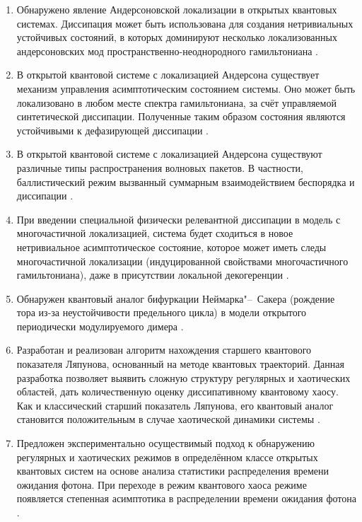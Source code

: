 {}
\begin{enumerate}[beginpenalty=10000] %
	\item Обнаружено явление Андерсоновской локализации в открытых квантовых системах. Диссипация может быть использована для создания нетривиальных устойчивых состояний, в которых доминируют несколько локализованных андерсоновских мод пространственно-неоднородного гамильтониана \cite{Yusipov2017}.
	\item В открытой квантовой системе с локализацией Андерсона существует механизм управления асимптотическим состоянием системы. Оно может быть локализовано в любом месте спектра гамильтониана, за счёт управляемой синтетической диссипации. Полученные таким образом состояния являются устойчивыми к дефазирующей диссипации \cite{Vershinina2017}.
	\item В открытой квантовой системе с локализацией Андерсона существуют различные типы распространения волновых пакетов. В частности, баллистический режим вызванный суммарным взаимодействием беспорядка и диссипации \cite{Yusipov2018}. 
	\item При введении специальной физически релевантной диссипации в модель с многочастичной локализацией, система будет сходиться в новое нетривиальное асимптотическое состояние, которое может иметь следы многочастичной локализации (индуцированной свойствами многочастичного гамильтониана), даже в присутствии локальной декогеренции \cite{Vakulchyk2018}.
	\item Обнаружен квантовый аналог бифуркации Неймарка"--~Сакера (рождение тора из-за неустойчивости предельного цикла) в модели открытого периодически модулируемого димера \cite{Yusipov2019_1}.
	\item Разработан и реализован алгоритм нахождения старшего квантового показателя Ляпунова, основанный на методе квантовых траекторий. Данная разработка позволяет выявить сложную структуру регулярных и хаотических областей, дать количественную оценку диссипативному квантовому хаосу. Как и классический старший показатель Ляпунова, его квантовый аналог становится положительным в случае хаотической динамики системы \cite{Yusipov2019_2}.
	\item Предложен экспериментально осуществимый подход к обнаружению регулярных и хаотических режимов в определённом классе открытых квантовых систем на основе анализа статистики распределения времени ожидания фотона. При переходе в режим квантового хаоса режиме появляется степенная асимптотика в распределении времени ожидания фотона \cite{Yusipov2020}.
\end{enumerate}

